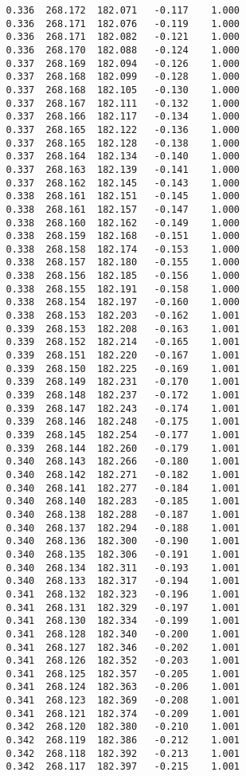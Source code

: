 \begin{verbatim}
   0.336  268.172  182.071   -0.117    1.000
   0.336  268.171  182.076   -0.119    1.000
   0.336  268.171  182.082   -0.121    1.000
   0.336  268.170  182.088   -0.124    1.000
   0.337  268.169  182.094   -0.126    1.000
   0.337  268.168  182.099   -0.128    1.000
   0.337  268.168  182.105   -0.130    1.000
   0.337  268.167  182.111   -0.132    1.000
   0.337  268.166  182.117   -0.134    1.000
   0.337  268.165  182.122   -0.136    1.000
   0.337  268.165  182.128   -0.138    1.000
   0.337  268.164  182.134   -0.140    1.000
   0.337  268.163  182.139   -0.141    1.000
   0.337  268.162  182.145   -0.143    1.000
   0.338  268.161  182.151   -0.145    1.000
   0.338  268.161  182.157   -0.147    1.000
   0.338  268.160  182.162   -0.149    1.000
   0.338  268.159  182.168   -0.151    1.000
   0.338  268.158  182.174   -0.153    1.000
   0.338  268.157  182.180   -0.155    1.000
   0.338  268.156  182.185   -0.156    1.000
   0.338  268.155  182.191   -0.158    1.000
   0.338  268.154  182.197   -0.160    1.000
   0.338  268.153  182.203   -0.162    1.001
   0.339  268.153  182.208   -0.163    1.001
   0.339  268.152  182.214   -0.165    1.001
   0.339  268.151  182.220   -0.167    1.001
   0.339  268.150  182.225   -0.169    1.001
   0.339  268.149  182.231   -0.170    1.001
   0.339  268.148  182.237   -0.172    1.001
   0.339  268.147  182.243   -0.174    1.001
   0.339  268.146  182.248   -0.175    1.001
   0.339  268.145  182.254   -0.177    1.001
   0.339  268.144  182.260   -0.179    1.001
   0.340  268.143  182.266   -0.180    1.001
   0.340  268.142  182.271   -0.182    1.001
   0.340  268.141  182.277   -0.184    1.001
   0.340  268.140  182.283   -0.185    1.001
   0.340  268.138  182.288   -0.187    1.001
   0.340  268.137  182.294   -0.188    1.001
   0.340  268.136  182.300   -0.190    1.001
   0.340  268.135  182.306   -0.191    1.001
   0.340  268.134  182.311   -0.193    1.001
   0.340  268.133  182.317   -0.194    1.001
   0.341  268.132  182.323   -0.196    1.001
   0.341  268.131  182.329   -0.197    1.001
   0.341  268.130  182.334   -0.199    1.001
   0.341  268.128  182.340   -0.200    1.001
   0.341  268.127  182.346   -0.202    1.001
   0.341  268.126  182.352   -0.203    1.001
   0.341  268.125  182.357   -0.205    1.001
   0.341  268.124  182.363   -0.206    1.001
   0.341  268.123  182.369   -0.208    1.001
   0.341  268.121  182.374   -0.209    1.001
   0.342  268.120  182.380   -0.210    1.001
   0.342  268.119  182.386   -0.212    1.001
   0.342  268.118  182.392   -0.213    1.001
   0.342  268.117  182.397   -0.215    1.001

\end{verbatim}
